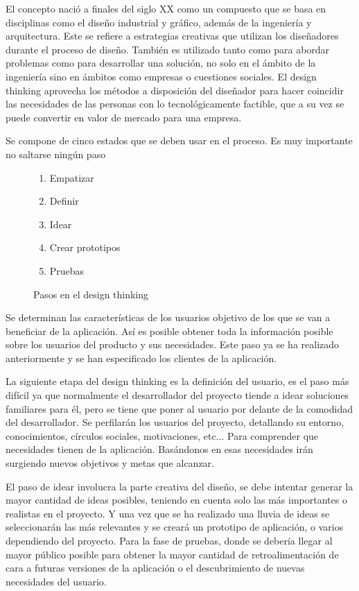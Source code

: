 El concepto nació a finales del siglo XX como un compuesto que se basa en disciplinas como el diseño industrial y gráfico, además de la ingeniería y arquitectura. Este se refiere a estrategias creativas que utilizan los diseñadores durante el proceso de diseño. También es utilizado tanto como para abordar problemas como para desarrollar una solución, no solo en el ámbito de la ingeniería sino en ámbitos como empresas o cuestiones sociales. El \gls{design thinking} aprovecha los métodos a disposición del diseñador para hacer coincidir las necesidades de las personas con lo tecnológicamente factible, que a su vez se puede convertir en valor de mercado para una empresa.

Se compone de cinco estados que se deben usar en el proceso. Es muy importante no saltarse ningún paso
\begin{figure}[h]
    \begin{enumerate}
        \item Empatizar
        \item Definir
        \item Idear
        \item Crear prototipos
        \item Pruebas
    \end{enumerate}
    \caption{Pasos en el design thinking}
    \label{list:stepsDesign}
\end{figure}

Se determinan las características de los usuarios objetivo de los que se van a beneficiar de la aplicación. Así es posible obtener toda la información posible sobre los usuarios del producto y sus necesidades. Este paso ya se ha realizado anteriormente y se han especificado los clientes de la aplicación.

La siguiente etapa del \gls{design thinking} es la definición del usuario, es el paso más difícil ya que normalmente el desarrollador del proyecto tiende a idear soluciones familiares para él, pero se tiene que poner al usuario por delante de la comodidad del desarrollador. Se perfilarán los usuarios del proyecto, detallando su entorno, conocimientos, círculos sociales, motivaciones, etc... Para comprender que necesidades tienen de la aplicación. Basándonos en esas necesidades irán surgiendo nuevos objetivos y metas que alcanzar.

El paso de idear involucra la parte creativa del diseño, se debe intentar generar la mayor cantidad de ideas posibles, teniendo en cuenta solo las más importantes o realistas en el proyecto. Y una vez que se ha realizado una lluvia de ideas se seleccionarán las más relevantes y se creará un prototipo de aplicación, o varios dependiendo del proyecto. Para la fase de pruebas, donde se debería llegar al mayor público posible para obtener la mayor cantidad de retroalimentación de cara a futuras versiones de la aplicación o el descubrimiento de nuevas necesidades del usuario. \cite{wolniak2017design}

